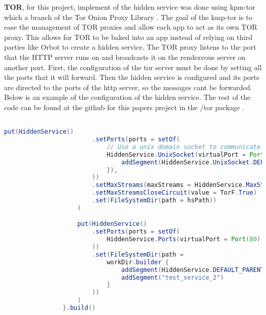 \documentclass[../main/main.tex]{subfiles}
\begin{document}
\textbf{TOR}, for this project, implement of the hidden service was done using kpm-tor \cite{KMPTOR} which a branch of the Tor Onion Proxy Library \cite{THALIGIT}.
The goal of the kmp-tor is to ease the management of TOR proxies and allow each app to act as its own TOR proxy. 
This allows for TOR to be baked into an app instead of relying on third parties like Orbot to create a hidden service. 
The TOR proxy listens to the port that the HTTP server runs on and broadcasts it on the rendezvous server on another port.
First, the configuration of the tor server must be done by setting all the ports that it will forward. 
Then the hidden service is configured and its ports are directed to the ports of the http server, so the messages cant be forwarded. Below is an example of the configuration of the hidden service. The rest of the code can be found at the github for this papers project in the /tor package \cite{PAPERGIT}.


\begin{lstlisting}[caption={Psuedocode for hidden service.}, label={lst:example5}, language=Java]

put(HiddenService()
                        .setPorts(ports = setOf(
                            // Use a unix domain socket to communicate via IPC instead of over TCP
                            HiddenService.UnixSocket(virtualPort = Port(80), targetUnixSocket = hsPath.builder {
                                addSegment(HiddenService.UnixSocket.DEFAULT_UNIX_SOCKET_NAME)
                            }),
                        ))
                        .setMaxStreams(maxStreams = HiddenService.MaxStreams(value = 2))
                        .setMaxStreamsCloseCircuit(value = TorF.True)
                        .set(FileSystemDir(path = hsPath))
                    )

                    put(HiddenService()
                        .setPorts(ports = setOf(
                            HiddenService.Ports(virtualPort = Port(80), targetPort = Port(5001))
                        ))
                        .set(FileSystemDir(path =
                            workDir.builder {
                                addSegment(HiddenService.DEFAULT_PARENT_DIR_NAME)
                                addSegment("test_service_2")
                            }
                        ))
                    )
                }.build()


\end{lstlisting}

\end{document}
